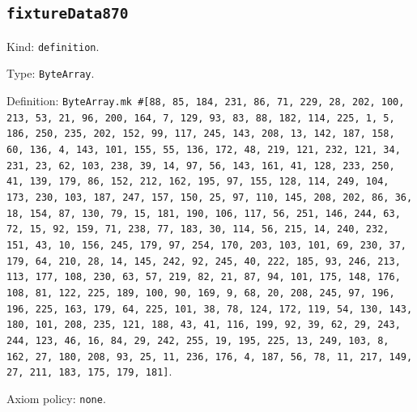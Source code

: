\documentclass[11pt]{article}
\begin{document}
\subsection*{\texttt{fixtureData870}}
\noindent Kind: \texttt{definition}.\par
\noindent Type: \texttt{ByteArray}.\par
\noindent Definition: \texttt{ByteArray.mk \#[88, 85, 184, 231, 86, 71, 229, 28, 202, 100, 213, 53, 21, 96, 200, 164, 7, 129, 93, 83, 88, 182, 114, 225, 1, 5, 186, 250, 235, 202, 152, 99, 117, 245, 143, 208, 13, 142, 187, 158, 60, 136, 4, 143, 101, 155, 55, 136, 172, 48, 219, 121, 232, 121, 34, 231, 23, 62, 103, 238, 39, 14, 97, 56, 143, 161, 41, 128, 233, 250, 41, 139, 179, 86, 152, 212, 162, 195, 97, 155, 128, 114, 249, 104, 173, 230, 103, 187, 247, 157, 150, 25, 97, 110, 145, 208, 202, 86, 36, 18, 154, 87, 130, 79, 15, 181, 190, 106, 117, 56, 251, 146, 244, 63, 72, 15, 92, 159, 71, 238, 77, 183, 30, 114, 56, 215, 14, 240, 232, 151, 43, 10, 156, 245, 179, 97, 254, 170, 203, 103, 101, 69, 230, 37, 179, 64, 210, 28, 14, 145, 242, 92, 245, 40, 222, 185, 93, 246, 213, 113, 177, 108, 230, 63, 57, 219, 82, 21, 87, 94, 101, 175, 148, 176, 108, 81, 122, 225, 189, 100, 90, 169, 9, 68, 20, 208, 245, 97, 196, 196, 225, 163, 179, 64, 225, 101, 38, 78, 124, 172, 119, 54, 130, 143, 180, 101, 208, 235, 121, 188, 43, 41, 116, 199, 92, 39, 62, 29, 243, 244, 123, 46, 16, 84, 29, 242, 255, 19, 195, 225, 13, 249, 103, 8, 162, 27, 180, 208, 93, 25, 11, 236, 176, 4, 187, 56, 78, 11, 217, 149, 27, 211, 183, 175, 179, 181]}.\par
\noindent Axiom policy: \texttt{none}.\par
\end{document}
